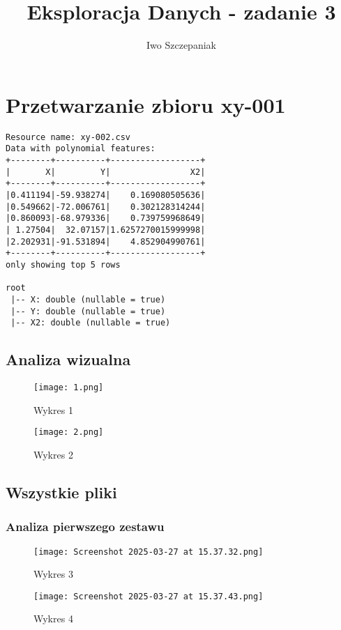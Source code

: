\documentclass{article}
\title{Eksploracja Danych - zadanie 3}
\author{Iwo Szczepaniak}
\begin{document}
\maketitle

\section{Przetwarzanie zbioru xy-001}
\begin{verbatim}
Resource name: xy-002.csv
Data with polynomial features:
+--------+----------+------------------+
|       X|         Y|                X2|
+--------+----------+------------------+
|0.411194|-59.938274|    0.169080505636|
|0.549662|-72.006761|    0.302128314244|
|0.860093|-68.979336|    0.739759968649|
| 1.27504|  32.07157|1.6257270015999998|
|2.202931|-91.531894|    4.852904990761|
+--------+----------+------------------+
only showing top 5 rows

root
 |-- X: double (nullable = true)
 |-- Y: double (nullable = true)
 |-- X2: double (nullable = true)
\end{verbatim}

\subsection{Analiza wizualna}
\begin{figure}[H]
    \centering
    \begin{minipage}{0.45\textwidth}
        \texttt{[image: 1.png]}
        \caption{Wykres 1}
    \end{minipage}
    \hfill
    \begin{minipage}{0.45\textwidth}
        \texttt{[image: 2.png]}
        \caption{Wykres 2}
    \end{minipage}
\end{figure}

\subsection{Wszystkie pliki}
\subsubsection{Analiza pierwszego zestawu}
\begin{figure}[H]
    \centering
    \begin{minipage}{0.45\textwidth}
        \texttt{[image: Screenshot 2025-03-27 at 15.37.32.png]}
        \caption{Wykres 3}
    \end{minipage}
    \hfill
    \begin{minipage}{0.45\textwidth}
        \texttt{[image: Screenshot 2025-03-27 at 15.37.43.png]}
        \caption{Wykres 4}
    \end{minipage}
\end{figure}
\end{document}
